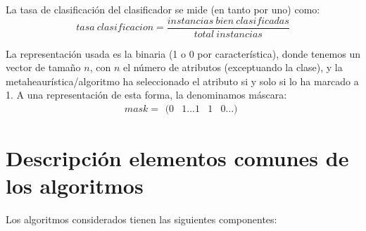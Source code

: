 \documentclass[a4paper,11pt]{article}
\begin{document}
La tasa de clasificación del clasificador se mide (en tanto por uno) como: $$tasa\: clasificacion = \frac{instancias\: 
bien\: clasificadas}{total\: instancias}$$

La representación usada es la binaria (1 o 0 por característica), donde tenemos un vector de tamaño $n$, con $n$ el número 
de atributos (exceptuando la clase), y la metaheaurística/algoritmo ha seleccionado el atributo si y solo si lo ha marcado 
a 1. A una representación de esta forma, la denominamos máscara: $$ mask =\begin{matrix} (0 & 1\ldots 1 & 1 & 0\ldots) 
\end{matrix}$$


\section{Descripción elementos comunes de los algoritmos}
Los algoritmos considerados tienen las siguientes componentes:
\end{document}
